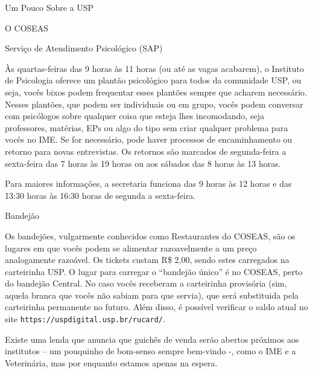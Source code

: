 \begin{secao}{Um Pouco Sobre a USP}
\begin{subsecao}{O COSEAS}
\end{subsecao}

\begin{subsecao}{Serviço de Atendimento Psicológico (SAP)}

Às quartas-feiras das 9 horas às 11 horas (ou até as vagas acabarem),
o Instituto de Psicologia oferece um plantão psicológico para todos da
comunidade USP, ou seja, vocês bixos podem frequentar esses plantões sempre
que acharem necessário. Nesses plantões, que podem ser individuais ou em
grupo, vocês podem conversar com psicólogos sobre qualquer coisa que esteja lhes
incomodando, seja professores, matérias, EPs ou algo do tipo sem criar qualquer
problema para vocês no IME. Se for necessário, pode haver processos de
encaminhamento ou retorno para novas entrevistas. Os retornos são marcados de
segunda-feira a sexta-feira das 7 horas às 19 horas ou aos sábados das
8 horas às 13 horas.

Para maiores informações, a secretaria funciona das 9 horas às 12 horas e das
13:30 horas às 16:30 horas de segunda a sexta-feira.

\end{subsecao}
\cleardoublepage %

\begin{subsecao}{Bandejão}


Os bandejões, vulgarmente conhecidos como Restaurantes do COSEAS, são os lugares
em que vocês podem se alimentar razoavelmente a um preço analogamente razoável.
Os tickets custam R\$ 2,00, sendo estes carregados na carteirinha USP. O
lugar para carregar o ``bandejão único'' é no COSEAS, perto do bandejão
Central. No caso vocês receberam a carteirinha provisória (sim, aquela
branca que vocês não sabiam para que servia), que será substituida pela
carteirinha permanente no futuro. Além disso, é possível verificar o saldo
atual no site {\tt https://uspdigital.usp.br/rucard/}.

Existe uma lenda que anuncia que guichês de venda serão abertos próximos aos
institutos – um pouquinho de bom-senso sempre bem-vindo -, como o IME e
a Veterinária, mas por enquanto estamos apenas na espera.


\end{subsecao}
\end{secao}
